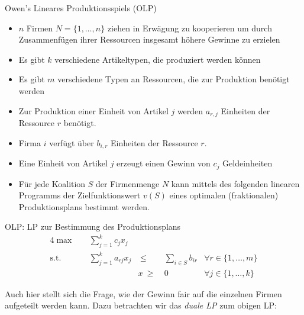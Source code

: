 \documentclass{panikzettel}
\begin{document}
\begin{defi}{Owen's Lineares Produktionsspiels (OLP)}
	\begin{itemize}
		\item $n$ Firmen $N = \{1, \dots, n \}$ ziehen in Erwägung zu kooperieren um durch Zusammenfügen ihrer Ressourcen insgesamt höhere Gewinne zu erzielen
		\item Es gibt $k$ verschiedene Artikeltypen, die produziert werden können
		\item Es gibt $m$ verschiedene Typen an Ressourcen, die zur Produktion benötigt werden
		\item Zur Produktion einer Einheit von Artikel $j$ werden $a_{r,j}$ Einheiten der Ressource $r$ benötigt.
		\item Firma $i$ verfügt über $b_{i,r}$ Einheiten der Ressource $r$.
		\item Eine Einheit von Artikel $j$ erzeugt einen Gewinn von $c_j$ Geldeinheiten
		\item Für jede Koalition $S$ der Firmenmenge $N$ kann mittels des folgenden linearen Programms der Zielfunktionswert $v(S)$ eines optimalen (fraktionalen) Produktionsplans bestimmt werden.
	\end{itemize}
\end{defi}

\begin{defi}{OLP: LP zur Bestimmung des Produktionsplans}
	\begin{alignat*}{4}
		\max \quad & \sum_{j=1}^{k} c_j x_j \\
		\text{s.t.} \quad & \sum_{j=1}^{k} a_{rj} x_j& ~\leq~ & \sum_{i \in S} b_{ir} & \forall r \in \{1, \dots, m\}  \\
		& & x  ~\geq~ & 0 & \forall j \in \{1, \dots, k\}
	\end{alignat*}
\end{defi}

Auch hier stellt sich die Frage, wie der Gewinn fair auf die einzelnen Firmen aufgeteilt werden kann. Dazu betrachten wir das \emph{duale LP} zum obigen LP:
\end{document}
